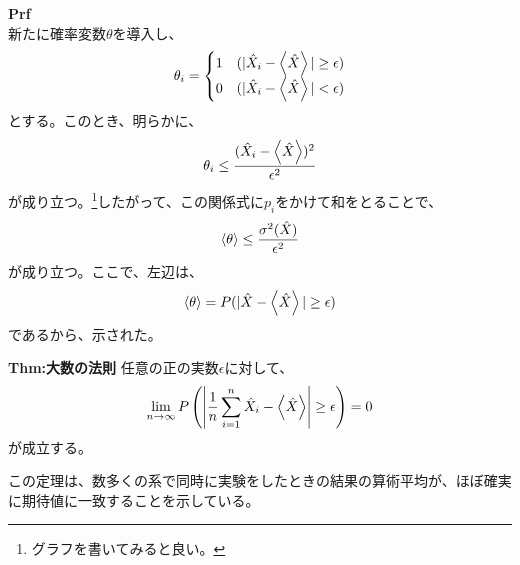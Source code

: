 \documentclass[a4paper,11pt]{jsarticle}
\numberwithin{equation}{section}
\begin{document}
\textbf{Prf}\\
新たに確率変数$\theta$を導入し、
\begin{align}
  \theta_i = \begin{cases}
    1 & (|\hat{X}_i - \expval{\hat{X}}| \geq \epsilon)\\
    0 & (|\hat{X}_i - \expval{\hat{X}}| < \epsilon)
  \end{cases}
\end{align}
とする。このとき、明らかに、
\begin{align}
  \theta_i \leq \frac{(\hat{X}_i - \expval{\hat{X}})^2}{\epsilon^2}
\end{align}
が成り立つ。\footnote{グラフを書いてみると良い。}したがって、この関係式に$p_i$をかけて和をとることで、
\begin{align}
  \ev{\theta} \leq \frac{\sigma^2(\hat{X})}{\epsilon^2}
\end{align}
が成り立つ。ここで、左辺は、
\begin{align}
  \ev{\theta} = P(|\hat{X} - \expval{\hat{X}}| \geq \epsilon)
\end{align}
であるから、示された。\hfill\qedsymbol\\

\begin{itembox}[l]{\textbf{Thm:大数の法則}}
  任意の正の実数$\epsilon$に対して、
  \begin{align}
    \lim_{n \to \infty} P\left(\left|\frac{1}{n} \sum_{i=1}^{n} \hat{X}_i - \expval{\hat{X}}\right| \geq \epsilon\right) = 0
  \end{align}
  が成立する。

\end{itembox}
この定理は、数多くの系で同時に実験をしたときの結果の算術平均が、ほぼ確実に期待値に一致することを示している。\\
\end{document}
